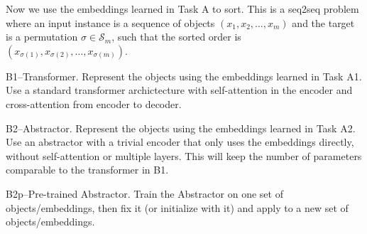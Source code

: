 \documentclass[12pt,pdftex,noinfoline]{imsart}
\def\S{{\mathcal{S}}}
\begin{document}
Now we use the embeddings learned in Task A to sort. This is a seq2seq problem where an input instance is a sequence of objects $(x_1,x_2,\ldots, x_m)$ and the target is a permutation $\sigma \in \S_m$, such that the sorted order 
is $(x_{\sigma(1)}, x_{\sigma(2)}, \ldots, x_{\sigma(m)})$.


B1--Transformer. Represent the objects using the embeddings learned in Task A1. Use a standard transformer 
archictecture with self-attention in the encoder and cross-attention from encoder to decoder. 

B2--Abstractor. Represent the objects using the embeddings learned in Task A2. Use an abstractor 
with a trivial encoder that only uses the embeddings directly, without self-attention or multiple layers. 
This will keep the number of parameters comparable to the transformer in B1.

B2p--Pre-trained Abstractor. Train the Abstractor on one set of objects/embeddings, then fix it (or initialize with it) and apply to a new set of objects/embeddings.
\end{document}
